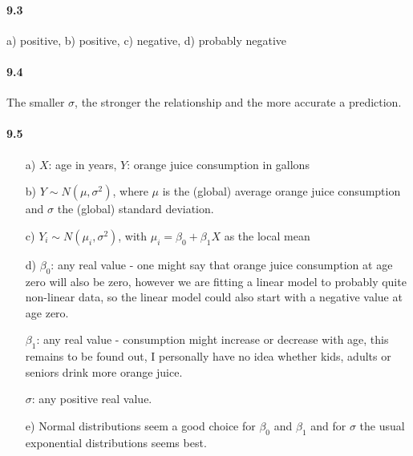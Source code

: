\documentclass[fontsize=11pt,DIV=18,parskip=half]{scrartcl}
\begin{document}
\paragraph{9.3} 
a) positive, b) positive, c) negative, d) probably negative

\paragraph{9.4} The smaller $\sigma$, the stronger the relationship and the more accurate a prediction. 

\paragraph{9.5} 
\begin{itemize}
\item[a)] $X$: age in years, $Y$: orange juice consumption in gallons
\item[b)] $Y \sim N(\mu, \sigma^2)$, where $\mu$ is the (global) average orange juice consumption and $\sigma$ the (global) standard deviation.
\item[c)] $Y_i \sim N(\mu_i, \sigma^2)$, with $\mu_i = \beta_0 + \beta_1 X$ as the local mean 
\item[d)] $\beta_0$: any real value - one might say that orange juice consumption at age zero will also be zero, however we are fitting a linear model to probably quite non-linear data, so the linear model could also start with a negative value at age zero.

$\beta_1$: any real value - consumption might increase or decrease with age, this remains to be found out, I personally have no idea whether kids, adults or seniors drink more orange juice.

$\sigma$: any positive real value.
\item[e)] Normal distributions seem a good choice for $\beta_0$ and $\beta_1$ and for $\sigma$ the usual exponential distributions seems best.


\end{itemize}
\end{document}
